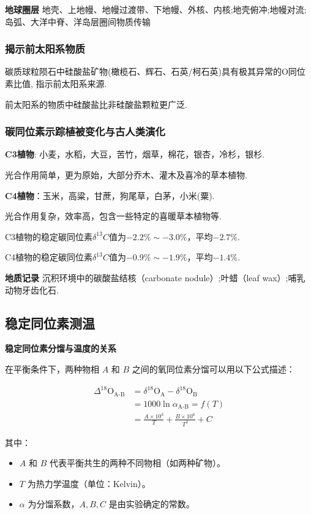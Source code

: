 \documentclass[12pt,a4paper]{article}
\begin{document}
	\textbf{地球圈层}
	地壳、上地幔、地幔过渡带、下地幔、外核、内核;地壳俯冲;地幔对流;岛弧、大洋中脊、洋岛层圈间物质传输
	
	\subsubsection{揭示前太阳系物质}
	碳质球粒陨石中硅酸盐矿物(橄榄石、辉石、石英/柯石英)具有极其异常的O同位素比值, 指示前太阳系来源.
	
	前太阳系的物质中硅酸盐比非硅酸盐颗粒更广泛.
	
	\subsubsection{碳同位素示踪植被变化与古人类演化}
	\textbf{C3植物}: 小麦，水稻，大豆，苦竹，烟草，棉花，银杏，冷杉，银杉.
	
	光合作用简单，更为原始，大部分乔木、灌木及喜冷的草本植物.
	
	\textbf{C4植物}：玉米，高粱，甘蔗，狗尾草，白茅，小米(粟).
	
	光合作用复杂，效率高，包含一些特定的喜暖草本植物等.
	
	C3植物的稳定碳同位素$\delta^{13}C$值为$-2.2\%\sim-3.0\%$，平均$-2.7\%$.
	
 	C4植物的稳定碳同位素$\delta^{13}C$值为$-0.9\%\sim-1.9\%$，平均$-1.4\%$.
	
	\textbf{地质记录}
	沉积环境中的碳酸盐结核（carbonate nodule）;叶蜡（leaf wax）;哺乳动物牙齿化石.
	
	\subsection{稳定同位素测温}
	\textbf{稳定同位素分馏与温度的关系}
	
	在平衡条件下，两种物相 $A$ 和 $B$ 之间的氧同位素分馏可以用以下公式描述：
	
	\begin{align}
		\Delta ^{18}\text{O}_{\text{A-B}} &= \delta ^{18}\text{O}_{\text{A}} - \delta ^{18}\text{O}_{\text{B}} \nonumber \\
		&= 1000 \ln \alpha_{\text{A-B}} = f(T) \nonumber \\
		&= \frac{A \times 10^3}{T} + \frac{B \times 10^6}{T^2} + C
	\end{align}
	
	\noindent 其中：
	\begin{itemize}
		\item $A$ 和 $B$ 代表平衡共生的两种不同物相（如两种矿物）。
		\item $T$ 为热力学温度（单位：$\text{Kelvin}$）。
		\item $\alpha$ 为分馏系数，$A, B, C$ 是由实验确定的常数。
	\end{itemize}
	
\end{document}
